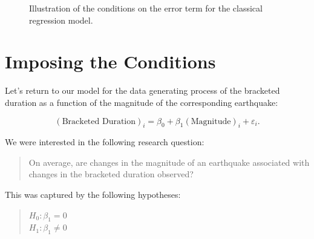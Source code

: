 \documentclass[
  letterpaper,
  DIV=11,
  numbers=noendperiod]{scrreprt}
\theoremstyle{plain}
\theoremstyle{definition}
\theoremstyle{definition}
\theoremstyle{remark}
\begin{document}
\begin{figure}


\caption{\label{fig-regconditions-assumptions}Illustration of the
conditions on the error term for the classical regression model.}

\end{figure}%

\section{Imposing the Conditions}\label{imposing-the-conditions}

Let's return to our model for the data generating process of the
bracketed duration as a function of the magnitude of the corresponding
earthquake:

\[(\text{Bracketed Duration})_i = \beta_0 + \beta_1(\text{Magnitude})_i + \varepsilon_i.\]

We were interested in the following research question:

\begin{quote}
On average, are changes in the magnitude of an earthquake associated
with changes in the bracketed duration observed?
\end{quote}

This was captured by the following hypotheses:

\begin{quote}
\(H_0: \beta_1 = 0\)\\
\(H_1: \beta_1 \neq 0\)
\end{quote}
\end{document}
